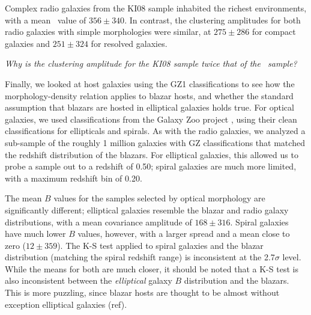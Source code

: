 \documentclass{emulateapj}
\begin{document}
Complex radio galaxies from the KI08 sample inhabited the richest environments, with a mean \bgb~value of $356\pm340$. In contrast, the clustering amplitudes for both radio galaxies with simple morphologies were similar, at $275\pm286$ for compact galaxies and $251\pm324$ for resolved galaxies. 

{\em Why is the clustering amplitude for the KI08 sample twice that of the \config~sample?}

Finally, we looked at host galaxies using the GZ1 classifications to see how the morphology-density relation applies to blazar hosts, and whether the standard assumption that blazars are hosted in elliptical galaxies holds true. For optical galaxies, we used classifications from the Galaxy Zoo project \citep[GZ;][]{lin11}, using their clean classifications for ellipticals and spirals. As with the radio galaxies, we analyzed a sub-sample of the roughly 1 million galaxies with GZ classifications that matched the redshift distribution of the blazars. For elliptical galaxies, this allowed us to probe a sample out to a redshift of 0.50; spiral galaxies are much more limited, with a maximum redshift bin of 0.20. 

The mean $B$ values for the samples selected by optical morphology are significantly different; elliptical galaxies resemble the blazar and radio galaxy distributions, with a mean covariance amplitude of $168\pm316$. Spiral galaxies have much lower $B$ values, however, with a larger spread and a mean close to zero ($12\pm359$). The K-S test applied to spiral galaxies and the blazar distribution (matching the spiral redshift range) is inconsistent at the 2.7$\sigma$ level. While the means for both are much closer, it should be noted that a K-S test is also inconsistent between the {\em elliptical} galaxy $B$ distribution and the blazars. This is more puzzling, since blazar hosts are thought to be almost without exception elliptical galaxies (ref). 
\end{document}
